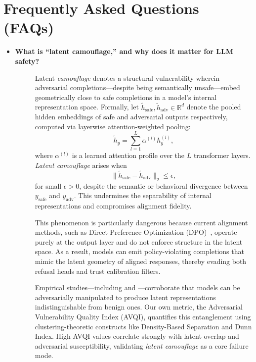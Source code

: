 


\newpage
\onecolumn

\section{Frequently Asked Questions (FAQs)}
\label{sec:FAQs}

\begin{itemize}[leftmargin=15pt,nolistsep]

\item[\ding{93}] { \selectfont \textbf{What is ``latent camouflage,'' and why does it matter for LLM safety?}}

\begin{description}
\item[]
Latent \textit{camouflage} denotes a structural vulnerability wherein adversarial completions—despite being semantically unsafe—embed geometrically close to safe completions in a model’s internal representation space. Formally, let $\tilde{h}_{\text{safe}}, \tilde{h}_{\text{adv}} \in \mathbb{R}^d$ denote the pooled hidden embeddings of safe and adversarial outputs respectively, computed via layerwise attention-weighted pooling:
\[
\tilde{h}_y = \sum_{l=1}^{L} \alpha^{(l)} h_y^{(l)},
\]
where $\alpha^{(l)}$ is a learned attention profile over the $L$ transformer layers. \textit{Latent camouflage} arises when
\[
\|\tilde{h}_{\text{safe}} - \tilde{h}_{\text{adv}}\|_2 \leq \epsilon,
\]
for small $\epsilon > 0$, despite the semantic or behavioral divergence between $y_{\text{safe}}$ and $y_{\text{adv}}$. This undermines the separability of internal representations and compromises alignment fidelity.

This phenomenon is particularly dangerous because current alignment methods, such as Direct Preference Optimization (DPO)~\citep{rafailov2023direct}, operate purely at the output layer and do not enforce structure in the latent space. As a result, models can emit policy-violating completions that mimic the latent geometry of aligned responses, thereby evading both refusal heads and trust calibration filters.

Empirical studies—including \citet{turpin2023llms} and \citet{carlini2023extracting}—corroborate that models can be adversarially manipulated to produce latent representations indistinguishable from benign ones. Our own metric, the Adversarial Vulnerability Quality Index (AVQI), quantifies this entanglement using clustering-theoretic constructs like Density-Based Separation and Dunn Index. High AVQI values correlate strongly with latent overlap and adversarial susceptibility, validating \textit{latent camouflage} as a core failure mode.


\end{description}
\end{itemize}
